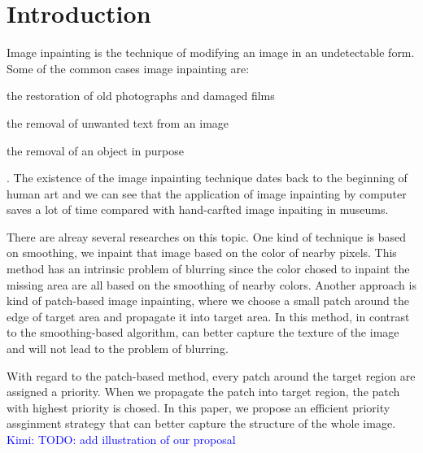 \section{Introduction}
Image inpainting is the technique of modifying an image in an undetectable
form. Some of the common cases image inpainting are:
\begin{enumerate*}[label=(\roman*)]
    \item the restoration of old photographs and damaged films
    \item the removal of unwanted text from an image
    \item the removal of an object in purpose
\end{enumerate*}. The existence of the image inpainting technique dates
back to the beginning of human art and we can see that the application of
image inpainting by computer saves a lot of time compared with hand-carfted
image inpaiting in museums.

There are alreay several researches on this topic. One kind of technique is
based on smoothing, \ie we inpaint that image based on the color of nearby
pixels. This method has an intrinsic problem of blurring since the color
chosed to inpaint the missing area are all based on the smoothing of nearby
colors. Another approach is kind of patch-based image inpainting, where
we choose a small patch around the edge of target area and propagate it into
target area. In this method, in contrast to the smoothing-based algorithm,
can better capture the texture of the image and will not lead to the problem
of blurring.

With regard to the patch-based method, every patch around the target region
are assigned a priority. When we propagate the patch into target region,
the patch with highest priority is chosed. In this paper, we propose an
efficient priority assginment strategy that can better capture the structure
of the whole image.
\textcolor{blue}{Kimi: TODO: add illustration of our proposal}
